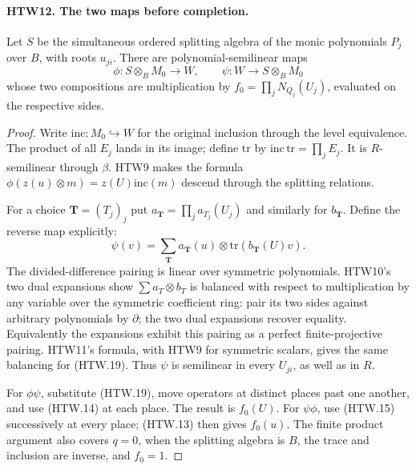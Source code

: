 \documentclass[11pt,a4paper]{article}
\numberwithin{equation}{section}
\theoremstyle{remark}\newtheorem{remark}[theorem]{Remark}
\begin{document}
\paragraph{HTW12. The two maps before completion.}
\label{claim:HTW12}
Let \(S\) be the simultaneous ordered splitting algebra
of the monic polynomials \(P_j\) over \(B\), with roots
\(u_{ji}\).  There are polynomial-semilinear maps
\[
 \phi:S\otimes_BM_0\longrightarrow W,\qquad
 \psi:W\longrightarrow S\otimes_BM_0
\]
whose two compositions are multiplication by
\(f_0=\prod_jN_{Q_j}(U_j)\), evaluated on the respective
sides.
\begin{proof}
Write \(\mathrm{inc}:M_0\hookrightarrow W\) for the
original inclusion through the level equivalence.
The product of all \(E_j\) lands in its image; define
\(\mathrm{tr}\) by
\(\mathrm{inc}\,\mathrm{tr}=\prod_jE_j\).
It is \(R\)-semilinear through \(\beta\).  HTW9 makes
the formula
\(\phi(z(u)\otimes m)=z(U)\mathrm{inc}(m)\)
descend through the splitting relations.

For a choice \(\mathbf T=(T_j)_j\) put
\(a_{\mathbf T}=\prod_ja_{T_j}(U_j)\) and similarly
for \(b_{\mathbf T}\).  Define the reverse map explicitly:
\[
 \psi(v)=\sum_{\mathbf T}a_{\mathbf T}(u)\otimes
                                     \mathrm{tr}(b_{\mathbf T}(U)v).
 \tag{HTW.19}
\]
The divided-difference pairing is linear over symmetric
polynomials.  HTW10's two dual expansions show
\(\sum a_T\otimes b_T\) is balanced with respect to
multiplication by any variable over the symmetric
coefficient ring: pair its two sides against arbitrary
polynomials by \(\partial\); the two dual expansions
recover equality.  Equivalently the expansions exhibit
this pairing as a perfect finite-projective pairing.
HTW11's formula, with HTW9 for symmetric scalars, gives
the same balancing for (HTW.19).  Thus \(\psi\) is
semilinear in every \(U_{ji}\), as well as in \(R\).

For \(\phi\psi\), substitute (HTW.19), move operators
at distinct places past one another, and use
(HTW.14) at each place.  The result is \(f_0(U)\).
For \(\psi\phi\), use (HTW.15) successively at every
place; (HTW.13) then gives \(f_0(u)\).
The finite product argument also covers \(q=0\),
when the splitting algebra is \(B\), the trace and
inclusion are inverse, and \(f_0=1\).
\end{proof}

\end{document}
